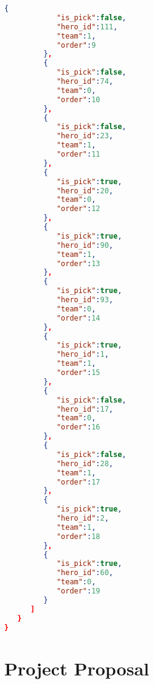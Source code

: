 \documentclass[12pt,a4paper]{book}
\begin{document}
\begin{lstlisting}[language=json,firstnumber=1]
         {  
            "is_pick":false,
            "hero_id":111,
            "team":1,
            "order":9
         },
         {  
            "is_pick":false,
            "hero_id":74,
            "team":0,
            "order":10
         },
         {  
            "is_pick":false,
            "hero_id":23,
            "team":1,
            "order":11
         },
         {  
            "is_pick":true,
            "hero_id":20,
            "team":0,
            "order":12
         },
         {  
            "is_pick":true,
            "hero_id":90,
            "team":1,
            "order":13
         },
         {  
            "is_pick":true,
            "hero_id":93,
            "team":0,
            "order":14
         },
         {  
            "is_pick":true,
            "hero_id":1,
            "team":1,
            "order":15
         },
         {  
            "is_pick":false,
            "hero_id":17,
            "team":0,
            "order":16
         },
         {  
            "is_pick":false,
            "hero_id":28,
            "team":1,
            "order":17
         },
         {  
            "is_pick":true,
            "hero_id":2,
            "team":1,
            "order":18
         },
         {  
            "is_pick":true,
            "hero_id":60,
            "team":0,
            "order":19
         }
      ]
   }
}
\end{lstlisting}
\chapter{Project Proposal}
\end{document}
